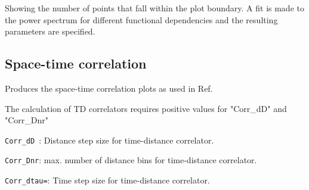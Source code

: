 Showing the number of points that fall within the plot boundary. A fit is made to the power spectrum for different functional dependencies and the resulting parameters are specified.

\subsection{Space-time correlation}

Produces the space-time correlation plots as used in Ref.~\cite{Wang:2023}

The calculation of TD correlators requires positive values for "Corr\_dD" and "Corr\_Dnr"
\begin{enumerate*}
\item \verb!Corr_dD !: Distance step size for time-distance correlator.
\item \verb!Corr_Dnr!: max. number of distance bins for time-distance correlator.
\item \verb!Corr_dtau=!: Time step size for time-distance correlator.
\end{enumerate*}


\clearpage 